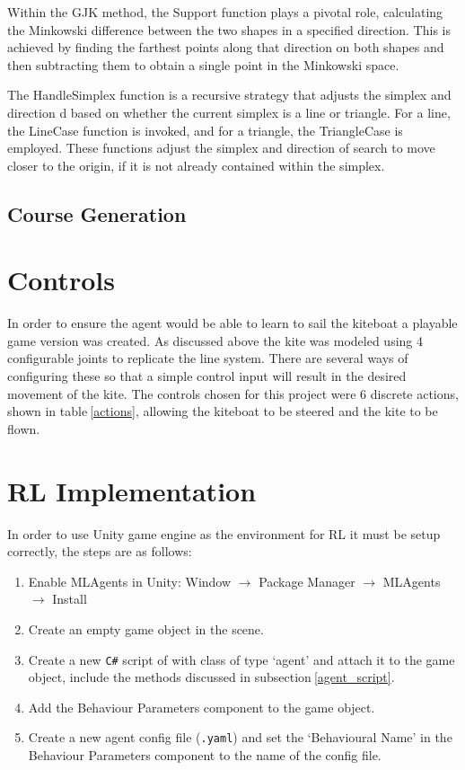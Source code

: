 Within the GJK method, the Support function plays a pivotal role, calculating the Minkowski difference between the two shapes in a specified direction. This is achieved by finding the farthest points along that direction on both shapes and then subtracting them to obtain a single point in the Minkowski space.

The HandleSimplex function is a recursive strategy that adjusts the simplex and direction d based on whether the current simplex is a line or triangle. For a line, the LineCase function is invoked, and for a triangle, the TriangleCase is employed. These functions adjust the simplex and direction of search to move closer to the origin, if it is not already contained within the simplex.

\subsection{Course Generation}


\section{Controls}
In order to ensure the agent would be able to learn to sail the kiteboat a playable game version was created. As discussed above the kite was modeled using 4 configurable joints to replicate the line system. There are several ways of configuring these so that a simple control input will result in the desired movement of the kite. The controls chosen for this project were 6 discrete actions, shown in table$~$\ref{actions}, allowing the kiteboat to be steered and the kite to be flown. 


\section{RL Implementation}\label{sec:RL_Implementation}

In order to use Unity game engine as the environment for RL it must be setup correctly, the steps are as follows:
\begin{enumerate}
    \item Enable MLAgents in Unity:
    Window $\rightarrow$ Package Manager $\rightarrow$ MLAgents $\rightarrow$ Install
    \item Create an empty game object in the scene.
    \item Create a new \texttt{C\#} script of with class of type `agent' and attach it to the game object, include the methods discussed in subsection$~$\ref{agent_script}.
    \item Add the Behaviour Parameters component to the game object.
    \item Create a new agent config file (\texttt{.yaml}) and set the `Behavioural Name' in the Behaviour Parameters component to the name of the config file.
\end{enumerate}  

